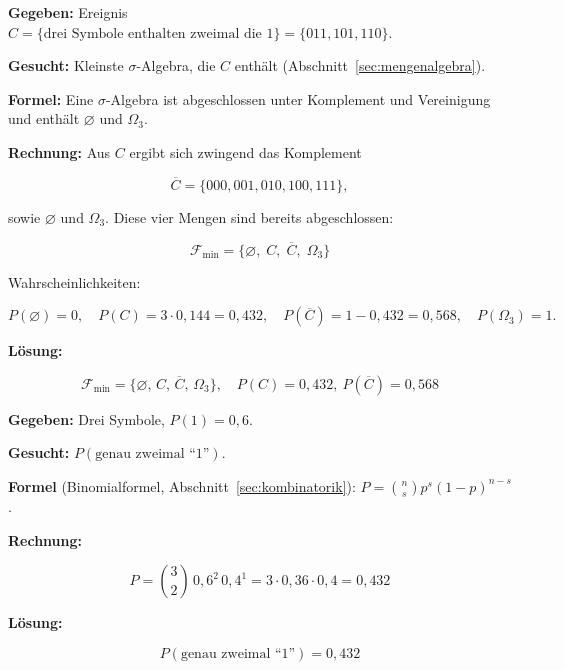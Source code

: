 \begin{beispiel}

\textbf{Gegeben:} Ereignis $C = \{\text{drei Symbole enthalten zweimal die 1}\}
= \{011,101,110\}$.

\textbf{Gesucht:} Kleinste $\sigma$-Algebra, die $C$ enthält
(Abschnitt~\ref{sec:mengenalgebra}).

\textbf{Formel:} Eine $\sigma$-Algebra ist abgeschlossen unter Komplement und
Vereinigung und enthält $\varnothing$ und $\Omega_3$.

\textbf{Rechnung:} Aus $C$ ergibt sich zwingend das Komplement

$$
\overline{C} = \{000,001,010,100,111\},
$$

sowie $\varnothing$ und $\Omega_3$. Diese vier Mengen sind bereits abgeschlossen:

$$
\mathcal{F}_{\min} = \{\varnothing,\; C,\; \overline{C},\; \Omega_3\}
$$

Wahrscheinlichkeiten:

$$
P(\varnothing)=0,\quad P(C)=3\cdot 0{,}144 = 0{,}432,\quad
P(\overline{C}) = 1-0{,}432 = 0{,}568,\quad P(\Omega_3)=1.
$$

\textbf{Lösung:}

$$
\boxed{\mathcal{F}_{\min} = \{\varnothing,\,C,\,\overline{C},\,\Omega_3\},\quad
P(C)=0{,}432,\ P(\overline{C})=0{,}568}
$$

\end{beispiel}

\begin{beispiel}

\textbf{Gegeben:} Drei Symbole, $P(1)=0{,}6$.

\textbf{Gesucht:} $P(\text{genau zweimal ``1''})$.

\textbf{Formel} (Binomialformel, Abschnitt~\ref{sec:kombinatorik}):
$P = \binom{n}{s}p^{s}(1-p)^{n-s}$.

\textbf{Rechnung:}

$$
P = \binom{3}{2}\,0{,}6^{2}\,0{,}4^{1} = 3\cdot 0{,}36\cdot 0{,}4 = 0{,}432
$$

\textbf{Lösung:}

$$
\boxed{P(\text{genau zweimal ``1''}) = 0{,}432}
$$

\end{beispiel}

